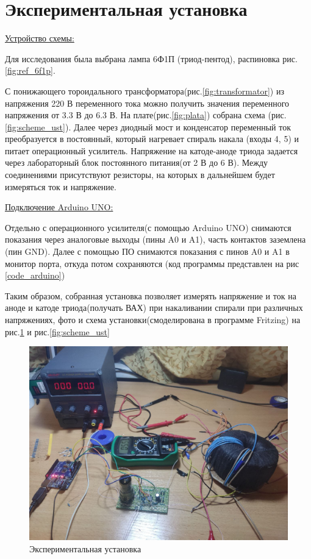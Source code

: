 \newpage
\section{Экспериментальная установка}

\underline{Устройство схемы:}

Для исследования была выбрана лампа 6Ф1П (триод-пентод), распиновка рис.\ref{fig:ref_6f1p}.

С понижающего тороидального трансформатора(рис.\ref{fig:transformator}) из напряжения 220 В переменного тока можно получить значения переменного напряжения от 3.3 В до 6.3 В. На плате(рис.\ref{fig:plata}) собрана схема (рис.\ref{fig:scheme_ust}). Далее через диодный мост и конденсатор переменный ток преобразуется в постоянный, который нагревает спираль накала (входы 4, 5) и питает операционный усилитель. Напряжение на катоде-аноде триода задается через лабораторный блок постоянного питания(от 2 В до 6 В). Между соединениями присутствуют резисторы, на которых в дальнейшем будет измеряться ток и напряжение. 

\underline{Подключение Arduino UNO:}

Отдельно с операционного усилителя(с помощью Arduino UNO) снимаются показания через аналоговые выходы (пины A0 и A1), часть контактов заземлена (пин GND). Далее с помощью ПО снимаются показания с пинов A0 и A1 в монитор порта, откуда потом сохраняются (код программы представлен на рис \ref{code_arduino})

Таким образом, собранная установка позволяет измерять напряжение и ток на аноде и катоде триода(получать ВАХ) при накаливании спирали при различных напряжениях, фото и схема установки(смоделирована в программе Fritzing) на рис.\ref{fig:foto_ust} и рис.\ref{fig:scheme_ust}

\begin{figure}[h!p]
    \centering
    \includegraphics[scale=0.4]{photo.jpg}
    \caption{Экспериментальная установка}
    \label{fig:foto_ust}
\end{figure}


